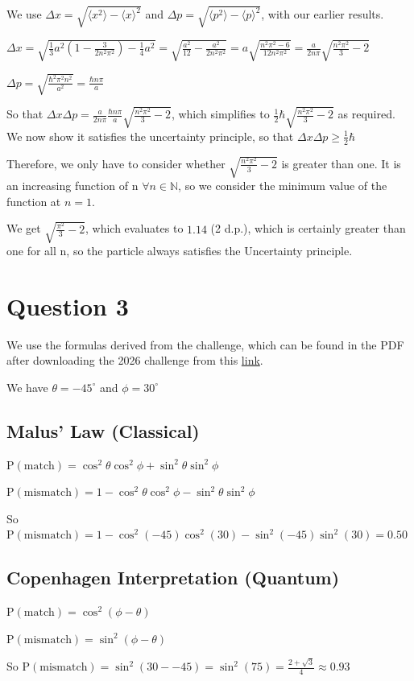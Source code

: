 \documentclass{article}
\newcommand{\Prob}{\mathrm{P}}
\begin{document}
We use $\Delta x = \sqrt{\langle x^2\rangle - \langle x \rangle^2}$ and $\Delta p = \sqrt{\langle p^2\rangle - \langle p \rangle^2}$, with our earlier results.

$\Delta x= \sqrt{\frac{1}{3}a^2(1-\frac{3}{2n^2\pi ^2}) -\frac{1}{4}a^2} = \sqrt{\frac{a^2}{12} - \frac{a^2}{2n^2\pi^2}} = a\sqrt{\frac{n^2\pi^2 - 6}{12n^2\pi^2}} = \frac{a}{2n\pi}\sqrt{\frac{n^2\pi^2}{3} - 2}$

$\Delta p= \sqrt{\frac{\hbar^2\pi^2n^2}{a^2}} = \frac{\hbar n \pi}{a}$

So that $\Delta x \Delta p = \frac{a}{2n\pi}\frac{\hbar n \pi}{a}\sqrt{\frac{n^2\pi^2}{3} - 2}$, which simplifies to $\frac{1}{2}\hbar \sqrt{\frac{n^2\pi^2}{3} - 2}$ as required.
\\

We now show it satisfies the uncertainty principle, so that $\Delta x \Delta p \geq \frac{1}{2}\hbar$

Therefore, we only have to consider whether $\sqrt{\frac{n^2\pi^2}{3} - 2}$ is greater than one. It is an increasing function of n $\forall n \in \mathbb{N}$, so we consider the minimum value of the function at $n = 1$. 

We get $\sqrt{\frac{\pi^2}{3} - 2}$, which evaluates to $1.14$ (2 d.p.), which is certainly greater than one for all n, so the particle always satisfies the Uncertainty principle.

\section{Question 3}

We use the formulas derived from the challenge, which can be found in the PDF after downloading the 2026 challenge from this \href{https://eclecticon.info/physics_bpho_compphys.htm}{link}.

We have $\theta = -45^\circ$ and $\phi=30^\circ$

\subsection*{Malus' Law (Classical)}

$\Prob(\text{match}) = \cos^2\theta \cos^2\phi + \sin^2\theta \sin^2\phi$
\noindent

$\Prob(\text{mismatch}) = 1 - \cos^2\theta \cos^2\phi - \sin^2\theta \sin^2\phi$

So $\Prob(\text{mismatch}) = 1 - \cos^2(-45) \cos^2(30) - \sin^2(-45) \sin^2(30) = 0.50$

\subsection*{Copenhagen Interpretation (Quantum)}

$\Prob(\text{match}) = \cos^2({\phi-\theta})$

$\Prob(\text{mismatch}) = \sin^2({\phi-\theta})$

So $\Prob(\text{mismatch}) = \sin^2({30- -45}) = \sin^2(75) = \frac{2+\sqrt{3}}{4} \approx 0.93$
\end{document}
